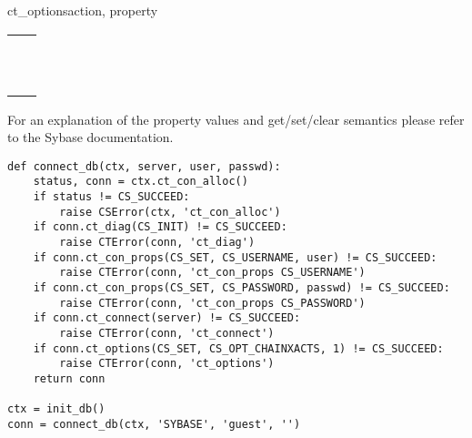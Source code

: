 \begin{methoddesc}[CS_CONNECTION]{ct_options}{action, property }
\begin{longtable}{l|l}
\code{CS_OPT_DATEFIRST}      & \code{int} \\
\code{CS_OPT_DATEFORMAT}     & \code{int} \\
\code{CS_OPT_ISOLATION}      & \code{int} \\
\code{CS_OPT_ROWCOUNT}       & \code{int} \\
\code{CS_OPT_TEXTSIZE}       & \code{int} \\

\code{CS_OPT_AUTHOFF}        & \code{string} \\
\code{CS_OPT_AUTHON}         & \code{string} \\
\code{CS_OPT_CURREAD}        & \code{string} \\
\code{CS_OPT_CURWRITE}       & \code{string} \\
\code{CS_OPT_IDENTITYOFF}    & \code{string} \\
\code{CS_OPT_IDENTITYON}     & \code{string} \\
\end{longtable}

For an explanation of the property values and get/set/clear semantics
please refer to the Sybase documentation.

\begin{verbatim}
def connect_db(ctx, server, user, passwd):
    status, conn = ctx.ct_con_alloc()
    if status != CS_SUCCEED:
        raise CSError(ctx, 'ct_con_alloc')
    if conn.ct_diag(CS_INIT) != CS_SUCCEED:
        raise CTError(conn, 'ct_diag')
    if conn.ct_con_props(CS_SET, CS_USERNAME, user) != CS_SUCCEED:
        raise CTError(conn, 'ct_con_props CS_USERNAME')
    if conn.ct_con_props(CS_SET, CS_PASSWORD, passwd) != CS_SUCCEED:
        raise CTError(conn, 'ct_con_props CS_PASSWORD')
    if conn.ct_connect(server) != CS_SUCCEED:
        raise CTError(conn, 'ct_connect')
    if conn.ct_options(CS_SET, CS_OPT_CHAINXACTS, 1) != CS_SUCCEED:
        raise CTError(conn, 'ct_options')
    return conn

ctx = init_db()
conn = connect_db(ctx, 'SYBASE', 'guest', '')
\end{verbatim}
\end{methoddesc}
